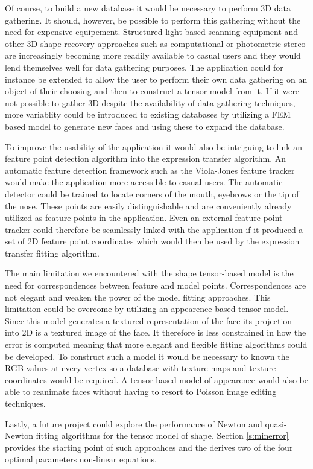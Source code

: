 \documentclass[11pt,a4paper,twoside]{report}
\begin{document}
Of course, to build a new database it would be necessary to perform 3D data
gathering. It should, however, be possible to perform this gathering without the
need for expensive equipement. Structured light based scanning equipment and other 3D shape recovery approaches
such as computational or photometric stereo are increasingly becoming more readily
available to casual users and they would lend themselves well for data gathering
purposes. The application could for instance be extended to allow the user to
perform their own data gathering on an object of their choosing and then to
construct a tensor model from it. If it were not possible to gather 3D despite the availability of data gathering techniques,
more variablity could be introduced to existing databases by utilizing a FEM based
model to generate new faces and using these to expand the database.

To improve the usability of the application it would also be intriguing to link
an feature point detection algorithm into the expression transfer algorithm. An
automatic feature detection framework such as the Viola-Jones feature tracker
\cite{viola} would make the application more accessible to casual users. The automatic detector could be trained to locate corners of the
mouth, eyebrows or the tip of the nose. These points are easily distinguishable
and are conveniently already utilized as feature points in the application. Even an external feature point tracker could therefore be
seamlessly linked with the application if it produced a set of 2D feature
point coordinates which would then be used by the expression transfer fitting algorithm.

The main limitation we encountered with the shape tensor-based model is the need for
correspondences between feature and model points. Correspondences are not
elegant and weaken the power of the model fitting approaches. This limitation
could be overcome by utilizing an appearence based tensor model. Since this
model generates a textured representation of the face its projection into
2D is a textured image of the face. It therefore is less constrained in how the
error is computed meaning that more elegant and flexible fitting algorithms
could be developed. To construct such a model it would be necessary to known the
RGB values at every vertex so a database with texture maps and texture
coordinates would be required. A tensor-based model of appearence would also
be able to reanimate faces without having to resort to Poisson image editing
techniques.

Lastly, a future project could explore the performance of Newton and quasi-Newton fitting
algorithms for the tensor model of shape. Section \ref{s:minerror} provides the starting point of such
approahces and the derives two of the four optimal parameters non-linear equations.


\end{document}
